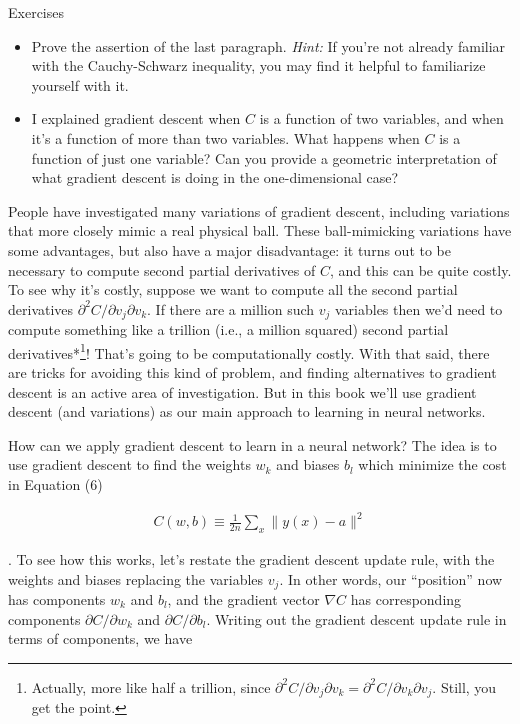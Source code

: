 \begin{exerciseBox}{Exercises}


\begin{itemize}

\item Prove the assertion of the last paragraph. \emph{Hint:} If you're not already familiar with the Cauchy-Schwarz inequality, you may find it helpful to familiarize yourself with it.

\item I explained gradient descent when $C$ is a function of two variables, and when it's a function of more than two variables. What happens when $C$ is a function of just one variable? Can you provide a geometric interpretation of what gradient descent is doing in the one-dimensional case?

\end{itemize}


People have investigated many variations of gradient descent, including variations that more closely mimic a real physical ball. These ball-mimicking variations have some advantages, but also have a major disadvantage: it turns out to be necessary to compute second partial derivatives of $C$, and this can be quite costly. To see why it's costly, suppose we want to compute all the second partial derivatives $\partial^2 C/ \partial v_j \partial v_k$. If there are a million such $v_j$ variables then we'd need to compute something like a trillion (i.e., a million squared) second partial derivatives*\footnote{Actually, more like half a trillion, since $\partial^2 C/ \partial v_j \partial v_k = \partial^2 C/ \partial v_k \partial v_j$. Still, you get the point.}! That's going to be computationally costly. With that said, there are tricks for avoiding this kind of problem, and finding alternatives to gradient descent is an active area of investigation. But in this book we'll use gradient descent (and variations) as our main approach to learning in neural networks.


How can we apply gradient descent to learn in a neural network? The idea is to use gradient descent to find the weights $w_k$ and biases $b_l$ which minimize the cost in Equation (6)

\begin{align*}
C(w,b) \equiv \frac{1}{2n} \sum_x \| y(x) - a\|^2 \nonumber
\end{align*}

\noindent. To see how this works, let's restate the gradient descent update rule, with the weights and biases replacing the variables $v_j$. In other words, our ``position'' now has components $w_k$ and $b_l$, and the gradient vector $\nabla C$ has corresponding components $\partial C / \partial w_k$ and $\partial C / \partial b_l$. Writing out the gradient descent update rule in terms of components, we have


\end{exerciseBox}
